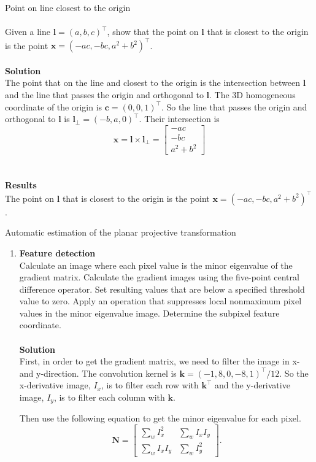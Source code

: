 \documentclass{../../assignment}
\date{\today}
\begin{document}
\begin{problemlist}
\pbitem Point on line closest to the origin
\\\\
Given a line $\mathbf{l} = (a,b,c)^{\top}$, show that the point on $\mathbf{l}$ that is closest to the origin is the point $\mathbf{x} = (-ac,-bc,a^2+b^2)^{\top}$.
\\\\
\textbf{Solution}\\
The point that on the line and closest to the origin is the intersection between $\mathbf{l}$ and the line that passes the origin and orthogonal to $\mathbf{l}$.
The 3D homogeneous coordinate of the origin is $\mathbf{c} = (0,0,1)^{\top}$. So the line that passes the origin and orthogonal to $\mathbf{l}$ is $\mathbf{l}_{\bot} = (-b, a, 0)^{\top}$. Their intersection is
$$
\mathbf{x} = \mathbf{l} \times \mathbf{l}_{\bot} = 
\begin{bmatrix}
-ac\\
-bc\\
a^2 + b^2
\end{bmatrix}
$$
\\\\
\textbf{Results}\\
The point on $\mathbf{l}$ that is closest to the origin is the point $\mathbf{x} = (-ac,-bc,a^2+b^2)^{\top}$.

\pbitem Automatic estimation of the planar projective transformation
\begin{enumerate}
\item \textbf{Feature detection}\\
Calculate an image where each pixel value is the minor eigenvalue of the gradient matrix. Calculate the gradient images using the five-point central difference operator. Set resulting values that are below a specified threshold value to zero. Apply an operation that suppresses local nonmaximum pixel values in the minor eigenvalue image. Determine the subpixel feature coordinate.
\\\\
\textbf{Solution}\\
First, in order to get the gradient matrix, we need to filter the image in x- and y-direction. The convolution kernel is $\mathbf{k} = (-1,8,0,-8,1)^{\top}/12$. So the x-derivative image, $I_x$, is to filter each row with $\mathbf{k}^{\top}$ and the y-derivative image, $I_y$, is to filter each column with $\mathbf{k}$.

Then use the following equation to get the minor eigenvalue for each pixel.
\[
\mathbf{N} = 
\begin{bmatrix}
\sum_w I_x^2 &  \sum_w I_x I_y\\
\sum_w I_x I_y & \sum_w I_y^2
\end{bmatrix}.
\]


\end{enumerate}
\end{problemlist}
\end{document}
